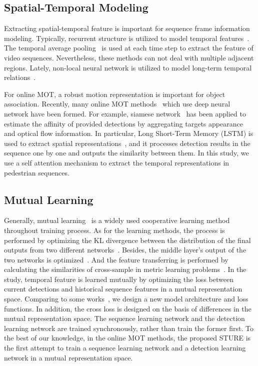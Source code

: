 \documentclass[times,twocolumn,final,authoryear]{elsarticle}
\begin{document}
\subsection{Spatial-Temporal Modeling}  
Extracting spatial-temporal feature is important for sequence frame information modeling.
Typically, recurrent structure is utilized to model temporal features~\citep{chung2017a, mclaughlin2016recurrent}.
The temporal average pooling~\citep{mclaughlin2016recurrent} is used at each time step to extract the feature of video sequences. 
Nevertheless, these methods can not deal with multiple adjacent regions. 
Lately, non-local neural network is utilized to model long-term temporal relations~\citep{RN580}.

For online MOT, a robust motion representation is important for object association. 
Recently, many online MOT methods~\citep{chu2017online,RN455,RN601} which use deep neural network have been formed. 
For example, siamese network~\citep{leal-taixe2016learning} has been applied to estimate the affinity of provided detections by aggregating targets appearance and optical flow information. 
In particular, Long Short-Term Memory (LSTM) is used to extract spatial representations~\citep{RN455}, and it processes detection results in the sequence one by one and outputs the similarity between them. 
In this study, we use {a} self attention mechanism to extract the temporal representations in pedestrian {sequences}.

\subsection{Mutual Learning} 
Generally, mutual learning~\citep{hinton2015distilling,romero2015fitnets,RN982} is a widely used cooperative learning method throughout training process. 
As for the learning methods, the process is performed by optimizing the KL divergence between the distribution of the final outputs from two different networks~\citep{RN983}.
Besides, the middle layer's output of the two networks is optimized~\citep{romero2015fitnets}. 
And the feature transferring is performed by calculating the similarities of cross-sample in metric learning problems~\citep{RN982, RN984}. 
In the study, temporal feature is learned mutually by optimizing the loss between current detections and historical sequence features in a mutual representation space.
Comparing to some works~\citep{RN982,RN927}, we design a new model architecture and loss functions.
In addition, the cross loss is designed on the basis of differences in the mutual representation space. 
The sequence learning network and the detection learning network are trained synchronously, rather than train the former first. 
To the best of our knowledge, in the online MOT methods, the proposed STURE is the first attempt to train a sequence learning network and a detection learning network in a mutual representation space.
\end{document}
